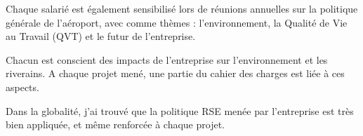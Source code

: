 Chaque salarié est également sensibilisé lors de réunions annuelles sur la politique générale de l'aéroport, avec comme thèmes : l'environnement, la Qualité de Vie au Travail (QVT) et le futur de l'entreprise.

Chacun est conscient des impacts de l'entreprise sur l'environnement et les riverains. A chaque projet mené, une partie du cahier des charges est liée à ces aspects.\newline

Dans la globalité, j’ai trouvé que la politique RSE menée par l’entreprise est très bien appliquée, et même renforcée à chaque projet.
